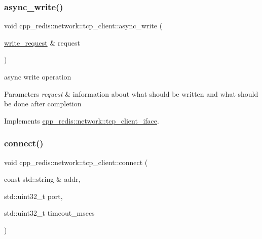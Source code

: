 \mbox{\label{classcpp__redis_1_1network_1_1tcp__client_a6d15785b71776cd85426c9634cb446f0}} 
\subsubsection{\texorpdfstring{async\+\_\+write()}{async\_write()}}
{\footnotesize\ttfamily void cpp\+\_\+redis\+::network\+::tcp\+\_\+client\+::async\+\_\+write (\begin{DoxyParamCaption}\item[{\hyperlink{structcpp__redis_1_1network_1_1tcp__client__iface_1_1write__request}{write\+\_\+request} \&}]{request }\end{DoxyParamCaption})\hspace{0.3cm}{\ttfamily [virtual]}}

async write operation


\begin{DoxyParams}{Parameters}
{\em request} & information about what should be written and what should be done after completion \\
\hline
\end{DoxyParams}


Implements \hyperlink{classcpp__redis_1_1network_1_1tcp__client__iface_a9cd01e8a68479456d15d6435ffad9b92}{cpp\+\_\+redis\+::network\+::tcp\+\_\+client\+\_\+iface}.

\mbox{\label{classcpp__redis_1_1network_1_1tcp__client_a5808c0569980d83479f755ac55a12dfb}} 
\subsubsection{\texorpdfstring{connect()}{connect()}}
{\footnotesize\ttfamily void cpp\+\_\+redis\+::network\+::tcp\+\_\+client\+::connect (\begin{DoxyParamCaption}\item[{const std\+::string \&}]{addr,  }\item[{std\+::uint32\+\_\+t}]{port,  }\item[{std\+::uint32\+\_\+t}]{timeout\+\_\+msecs }\end{DoxyParamCaption})\hspace{0.3cm}{\ttfamily [virtual]}}

